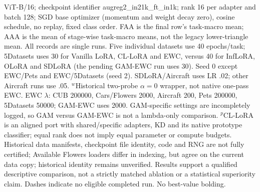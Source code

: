 \begin{table}[t]
\begin{minipage}{\linewidth}
ViT-B/16; checkpoint identifier \textnormal{augreg2\_in21k\_ft\_in1k}; rank 16 per adapter and batch 128; SGD base optimizer (momentum and weight decay zero), cosine schedule, no replay, fixed class order. FAA is the final row's task-macro mean; AAA is the mean of stage-wise task-macro means, not the legacy lower-triangle mean. All records are single runs. Five individual datasets use 40 epochs/task; 5Datasets uses 30 for Vanilla LoRA, CL-LoRA and EWC, versus 40 for InfLoRA, OLoRA and SDLoRA (the pending GAM-EWC run uses 30). Seed 0 except EWC/Pets and EWC/5Datasets (seed 2). SDLoRA/Aircraft uses LR .02; other Aircraft runs use .05. $^{w}$Historical two-probe $\alpha=0$ wrapper, not native one-pass EWC. EWC $\lambda$: CUB 200000, Cars/Flowers 2000, Aircraft 200, Pets 200000, 5Datasets 50000; GAM-EWC uses 2000. GAM-specific settings are incompletely logged, so GAM versus GAM-EWC is not a lambda-only comparison. $^{p}$CL-LoRA is an aligned port with shared/specific adapters, KD and its native prototype classifier; equal rank does not imply equal parameter or compute budgets. Historical data manifests, checkpoint file identity, code and RNG are not fully certified; Available Flowers loaders differ in indexing, but agree on the current data copy; historical identity remains unverified. Results support a qualified descriptive comparison, not a strictly matched ablation or a statistical superiority claim. Dashes indicate no eligible completed run. No best-value bolding.
\end{minipage}
\end{table}
